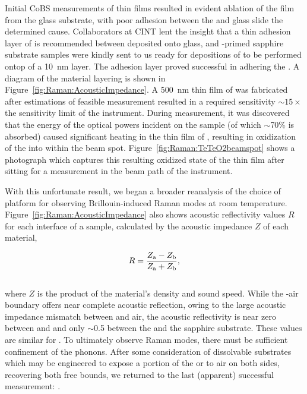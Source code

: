 \begin{table}[h]
    \label{tab:Raman:Te}
\end{table}

Initial \ac{CoBS} measurements of  thin films resulted in evident ablation of the film from the glass substrate, with poor adhesion between the  and glass slide the determined cause. Collaborators at \ac{CINT} lent the insight that a thin adhesion layer of  is recommended between  deposited onto glass, and -primed sapphire substrate samples were kindly sent to us ready for depositions of  to be performed ontop of a \SI{10}{\nano\meter}  layer. The  adhesion layer proved successful in adhering the . A diagram of the material layering is shown in Figure~\ref{fig:Raman:AcousticImpedance}. A \SI{500}{\nano\meter} thin film of  was fabricated after estimations of feasible measurement resulted in a required sensitivity \(\sim15\times\) the sensitivity limit of the instrument. During measurement, it was discovered that the energy of the optical powers incident on the sample (of which \(\sim\)70\% is absorbed) caused significant heating in the thin film of , resulting in oxidization of the  into  within the beam spot. Figure~\ref{fig:Raman:TeTeO2beamspot} shows a photograph which captures this resulting oxidized state of the  thin film after sitting for a measurement in the beam path of the instrument.

With this unfortunate result, we began a broader reanalysis of the choice of platform for observing Brillouin-induced Raman modes at room temperature. Figure~\ref{fig:Raman:AcousticImpedance} also shows acoustic reflectivity values \(R\) for each interface of a  sample, calculated by the acoustic impedance \(Z\) of each material,

\begin{equation}
  R = \frac{Z_{\rm a} - Z_{\rm b}}{Z_{\rm a} + Z_{\rm b}},
\end{equation}
\\
where \(Z\) is the product of the material's density and sound speed. While the -air boundary offers near complete acoustic reflection, owing to the large acoustic impedance mismatch between  and air, the acoustic reflectivity is near zero between  and  and only \(\sim\)0.5 between the  and the sapphire substrate. These values are similar for . To ultimately observe Raman modes, there must be sufficient confinement of the phonons. After some consideration of dissolvable substrates which may be engineered to expose a portion of the  or  to air on both sides, recovering both free bounds, we returned to the last (apparent) successful measurement: .

